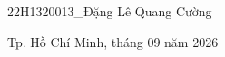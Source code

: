 \begin{titlepage}
\begin{center}
\begin{minipage}[t]{10cm}
	\vspace{0.30cm}
	
	{\Large 22H1320013\_Đặng Lê Quang Cường}
	
	\vspace{0.30cm}
	
\end{minipage}
\end{center}






\vspace{1.9cm}

\begin{center}
	{\Large Tp. Hồ Chí Minh, tháng 09 năm 2026}
\end{center}

\end{titlepage}
	